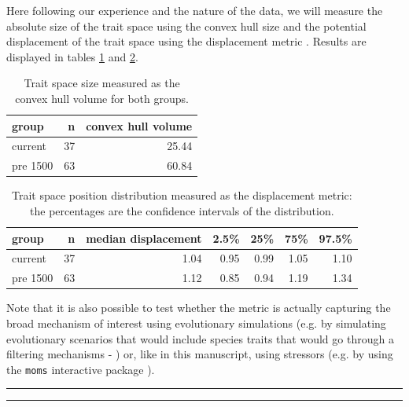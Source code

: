 \documentclass[12pt,letterpaper]{article}
\begin{document}
Here following our experience and the nature of the data, we will measure the absolute size of the trait space using the convex hull size and the potential displacement of the trait space using the displacement metric \citep{guillerme2020shifting}.
Results are displayed in tables \ref{Tab:results_convhull} and \ref{Tab:displacement}.

\begin{table}[ht]
\centering
\begin{tabular}{lrr}
  \hline
 group & n & convex hull volume \\ 
  \hline
 current &  37 & 25.44 \\ 
 pre 1500 &  63 & 60.84 \\ 
   \hline
\end{tabular}
\caption{Trait space size measured as the convex hull volume for both groups.}
\label{Tab:results_convhull}
\end{table}



\begin{table}[ht]
\centering
\begin{tabular}{lrrrrrr}
  \hline
 group & n & median displacement & 2.5\% & 25\% & 75\% & 97.5\% \\ 
  \hline
 current &  37 & 1.04 & 0.95 & 0.99 & 1.05 & 1.10 \\ 
 pre 1500 &  63 & 1.12 & 0.85 & 0.94 & 1.19 & 1.34 \\ 
   \hline
\end{tabular}
\caption{Trait space position distribution measured as the displacement metric: the percentages are the confidence intervals of the distribution.}
\label{Tab:displacement}
\end{table}

Note that it is also possible to test whether the metric is actually capturing the broad mechanism of interest using evolutionary simulations (e.g. by simulating evolutionary scenarios that would include species traits that would go through a filtering mechanisms - \citealt{guillerme2024treats}) or, like in this manuscript, using stressors (e.g. by using the \texttt{moms} interactive package \citealt{guillerme2020shifting}).


\bigskip
\bigskip
\hrule
\hrule
\end{document}
